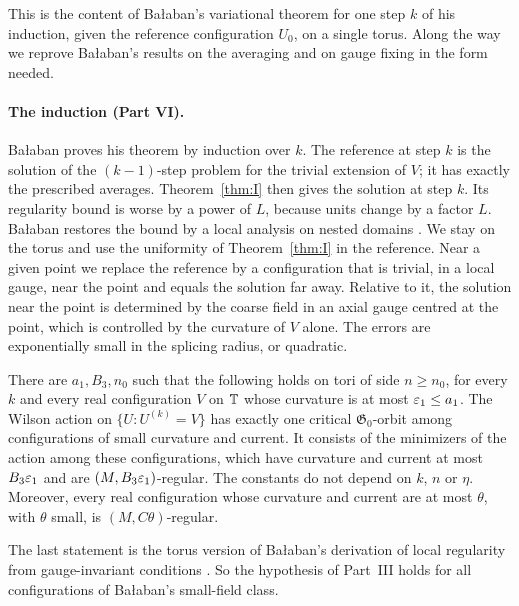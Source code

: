 This is the content of Ba\l aban's variational theorem \cite[Theorem~1]{BalVar} for one step $k$ of his induction, given the reference configuration $U_0$, on a single torus. Along the way we reprove Ba\l aban's results on the averaging \cite{BalAvg} and on gauge fixing \cite{BalReg} in the form needed.

\paragraph{The induction (Part VI).} Ba\l aban proves his theorem by induction over $k$. The reference at step $k$ is the solution of the $(k-1)$-step problem for the trivial extension of $V$; it has exactly the prescribed averages. Theorem~\ref{thm:I} then gives the solution at step $k$. Its regularity bound is worse by a power of $L$, because units change by a factor $L$. Ba\l aban restores the bound by a local analysis on nested domains \cite[Sect.~F]{BalVar}. We stay on the torus and use the uniformity of Theorem~\ref{thm:I} in the reference. Near a given point we replace the reference by a configuration that is trivial, in a local gauge, near the point and equals the solution far away. Relative to it, the solution near the point is determined by the coarse field in an axial gauge centred at the point, which is controlled by the curvature of $V$ alone. The errors are exponentially small in the splicing radius, or quadratic.

\begin{maintheorem}\label{thm:J}
There are $a_1,B_3,n_0$ such that the following holds on tori of side $n\ge n_0$, for every $k$ and every real configuration $V$ on $\mathbb T$ whose curvature is at most $\varepsilon_1\le a_1$. The Wilson action on $\{U:U^{(k)}=V\}$ has exactly one critical $\mathfrak G_0$-orbit among configurations of small curvature and current. It consists of the minimizers of the action among these configurations, which have curvature and current at most $B_3\varepsilon_1$ and are $(M,B_3\varepsilon_1)$-regular. The constants do not depend on $k$, $n$ or $\eta$. Moreover, every real configuration whose curvature and current are at most $\theta$, with $\theta$ small, is $(M,C\theta)$-regular.
\end{maintheorem}

The last statement is the torus version of Ba\l aban's derivation of local regularity from gauge-invariant conditions \cite[Sect.~F]{BalReg}. So the hypothesis of Part~III holds for all configurations of Ba\l aban's small-field class.

